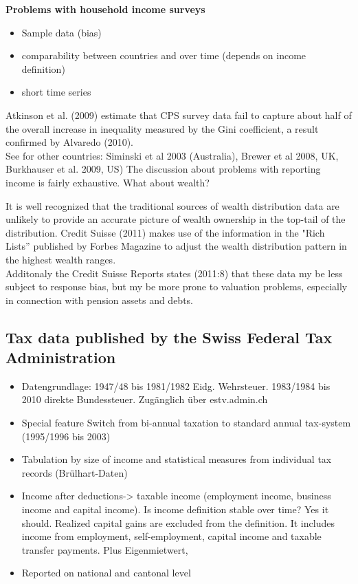 \documentclass[twoside]{article}\usepackage[]{graphicx}\usepackage[]{color}
\begin{document}
\begin{multicols}{2}
\textbf{Problems with household income surveys}
\begin{itemize}
\item Sample data (bias)
\item comparability between countries and over time (depends on income definition)
\item short time series
\end{itemize}

Atkinson et al. (2009) estimate that CPS survey data fail to capture about half of the overall increase in inequality measured by the Gini coefficient, a result confirmed by Alvaredo (2010). \\

See for other countries: Siminski et al 2003 (Australia), Brewer et al 2008, UK, Burkhauser et al. 2009, US)
The discussion about problems with reporting income is fairly exhaustive. What about wealth?

It is well recognized that the traditional sources of wealth distribution data are unlikely to provide an accurate picture of wealth ownership in the top-tail of the distribution. Credit Suisse (2011) makes use of the information in the "Rich Lists'' published by Forbes Magazine to adjust the wealth distribution pattern in the highest wealth ranges. \\

Additonaly the Credit Suisse Reports states (2011:8) that these data my be less subject to response bias, but my be more prone to valuation problems, especially in connection with pension assets and debts.

\subsection{Tax data published by the Swiss Federal Tax Administration}

\begin{itemize}
\item	Datengrundlage: 1947/48 bis 1981/1982 Eidg. Wehrsteuer. 1983/1984 bis 2010 direkte Bundessteuer. Zugänglich über estv.admin.ch
	\item	Special feature Switch from bi-annual taxation to standard annual tax-system (1995/1996 bis 2003)
	\item	Tabulation by size of income and statistical measures from individual tax records (Brülhart-Daten)
	\item	Income after deductions-> taxable income (employment income, business income and capital income). Is income definition stable over time? Yes it should. Realized capital gains are excluded from the definition. It includes income from  employment, self-employment, capital income and taxable transfer payments. Plus Eigenmietwert, 
	\item	Reported on national and cantonal level
\end{itemize}


\end{multicols}
\end{document}
